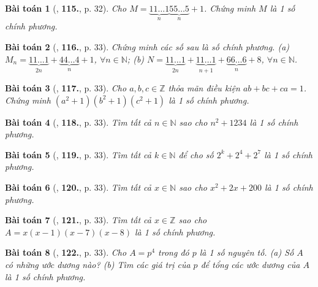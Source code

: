 \documentclass{article}
\numberwithin{equation}{section}
\newtheorem{baitoan}{Bài toán}
\begin{document}
\begin{baitoan}[\cite{Tuyen_Toan_8}, \textbf{115.}, p. 32]
	Cho $M = \underbrace{11\ldots1}_n\underbrace{55\ldots5}_n + 1$. Chứng minh $M$ là 1 số chính phương.
\end{baitoan}

\begin{baitoan}[\cite{Tuyen_Toan_8}, \textbf{116.}, p. 33]
	Chứng minh các số sau là số chính phương. (a) $M_n = \underbrace{11\ldots1}_{2n} + \underbrace{44\ldots4}_n + 1$, $\forall n\in\mathbb{N}$; (b) $N = \underbrace{11\ldots1}_{2n} + \underbrace{11\ldots1}_{n+1} + \underbrace{66\ldots6}_n + 8$, $\forall n\in\mathbb{N}$.
\end{baitoan}

\begin{baitoan}[\cite{Tuyen_Toan_8}, \textbf{117.}, p. 33]
	Cho $a,b,c\in\mathbb{Z}$ thỏa mãn điều kiện $ab + bc + ca = 1$. Chứng minh $(a^2 + 1)(b^2 + 1)(c^2 + 1)$ là 1 số chính phương.
\end{baitoan}

\begin{baitoan}[\cite{Tuyen_Toan_8}, \textbf{118.}, p. 33]
	Tìm tất cả $n\in\mathbb{N}$ sao cho $n^2 + 1234$ là 1 số chính phương.
\end{baitoan}

\begin{baitoan}[\cite{Tuyen_Toan_8}, \textbf{119.}, p. 33]
	Tìm tất cả $k\in\mathbb{N}$ để cho số $2^k + 2^4 + 2^7$ là 1 số chính phương.
\end{baitoan}

\begin{baitoan}[\cite{Tuyen_Toan_8}, \textbf{120.}, p. 33]
	Tìm tất cả $x\in\mathbb{N}$ sao cho $x^2 + 2x + 200$ là 1 số chính phương.
\end{baitoan}

\begin{baitoan}[\cite{Tuyen_Toan_8}, \textbf{121.}, p. 33]
	Tìm tất cả $x\in\mathbb{Z}$ sao cho $A = x(x - 1)(x - 7)(x - 8)$ là 1 số chính phương.
\end{baitoan}

\begin{baitoan}[\cite{Tuyen_Toan_8}, \textbf{122.}, p. 33]
	Cho $A = p^4$ trong đó $p$ là 1 số nguyên tố. (a) Số $A$ có những ước dương nào? (b) Tìm các giá trị của $p$ để tổng các ước dương của $A$ là 1 số chính phương.
\end{baitoan}

\end{document}
